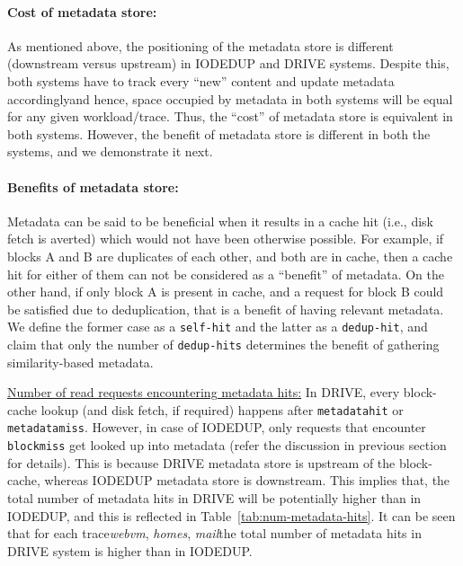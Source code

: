 \paragraph{Cost of metadata store:} 
As mentioned above, the positioning of the metadata store is
different (downstream versus upstream) in IODEDUP and DRIVE systems.
Despite this, both systems have to track every ``new'' content 
and update metadata accordingly\textemdash{}and hence, space occupied
by metadata in both systems will be equal for any given workload/trace.
Thus, the ``cost'' of metadata store is equivalent in both systems.
However, the benefit of metadata store is different in both the
systems, and we demonstrate it next.

\paragraph{Benefits of metadata store:}
Metadata can be said to be beneficial when it results in a cache 
hit (i.e., disk fetch is averted) which would not have been otherwise possible.
For example, if blocks A and B are duplicates of each other, and both
are in cache, then a cache hit for either of them can not be considered
as a ``benefit'' of metadata. On the other hand, if only block A is present in 
cache, and a request for block B could be satisfied due to deduplication,
that is a benefit of having relevant metadata. We define the former case
as a \texttt{self-hit} and the latter as a \texttt{dedup-hit}, and claim
that only the number of \texttt{dedup-hits} determines the benefit of 
gathering similarity-based metadata. %

\underline{Number of read requests encountering metadata hits:}
In DRIVE, every block-cache lookup (and disk fetch, if required) happens
after \texttt{metadatahit} or \texttt{metadatamiss}. However, 
in case of IODEDUP, only requests that encounter \texttt{blockmiss}
get looked up into metadata (refer the discussion in previous section for details).
This is because DRIVE metadata store is upstream of the block-cache,
whereas IODEDUP metadata store is downstream. This implies that,
the total number of metadata hits in DRIVE will be potentially 
higher than in IODEDUP, and this is reflected in Table~\ref{tab:num-metadata-hits}.
It can be seen that for each trace\textemdash{}\textit{webvm}, \textit{homes}, 
\textit{mail}\textemdash{}the
total number of metadata hits in DRIVE system is higher than in IODEDUP.

